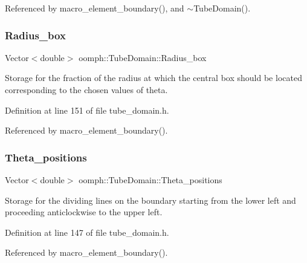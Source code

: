 Referenced by macro\+\_\+element\+\_\+boundary(), and $\sim$\+Tube\+Domain().

\mbox{\label{classoomph_1_1TubeDomain_ad70a97648fd496d9f5322e122ef907e4}} 
\subsubsection{\texorpdfstring{Radius\+\_\+box}{Radius\_box}}
{\footnotesize\ttfamily Vector$<$double$>$ oomph\+::\+Tube\+Domain\+::\+Radius\+\_\+box\hspace{0.3cm}{\ttfamily [private]}}

Storage for the fraction of the radius at which the central box should be located corresponding to the chosen values of theta. 

Definition at line 151 of file tube\+\_\+domain.\+h.



Referenced by macro\+\_\+element\+\_\+boundary().

\mbox{\label{classoomph_1_1TubeDomain_a893b7c0f20f3971948bf4ab04d3fe182}} 
\subsubsection{\texorpdfstring{Theta\+\_\+positions}{Theta\_positions}}
{\footnotesize\ttfamily Vector$<$double$>$ oomph\+::\+Tube\+Domain\+::\+Theta\+\_\+positions\hspace{0.3cm}{\ttfamily [private]}}



Storage for the dividing lines on the boundary starting from the lower left and proceeding anticlockwise to the upper left. 



Definition at line 147 of file tube\+\_\+domain.\+h.



Referenced by macro\+\_\+element\+\_\+boundary().

\mbox{\label{classoomph_1_1TubeDomain_a6dd70d59e8cd65e44444f78fbfa1f97a}} 
